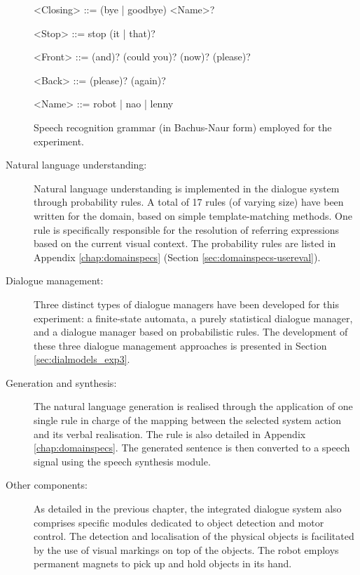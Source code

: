 \begin{description}
\begin{table}[p!]
\begin{grammar}
<Closing> ::= (bye | goodbye) <Name>?

<Stop> ::= stop (it | that)?
 
<Front> ::= (and)? (could you)? (now)? (please)?

<Back> ::= (please)? (again)?

<Name> ::= robot | nao | lenny

\end{grammar}
\caption{Speech recognition grammar (in Bachus-Naur form) employed for the experiment.}
\label{table:asr}
\end{table}

\item[Natural language understanding: ] Natural language understanding is implemented in the dialogue system through probability rules.  A total of 17 rules (of varying size) have been written for the domain, based on simple template-matching methods. One rule is specifically responsible for the resolution of referring expressions based on the current visual context. The probability rules are listed in Appendix \ref{chap:domainspecs} (Section \ref{sec:domainspecs-usereval}). 

\item[Dialogue management: ] Three distinct types of dialogue managers have been developed for this experiment: a finite-state automata, a purely statistical dialogue manager, and a dialogue manager based on probabilistic rules.  The development of these three dialogue management approaches is presented in Section \ref{sec:dialmodels_exp3}. 

\item[Generation and synthesis: ] The natural language generation is realised through the application of one single rule in charge of the mapping between the selected system action and its verbal realisation. The rule is also detailed in Appendix \ref{chap:domainspecs}.  The generated sentence is then converted to a speech signal using the speech synthesis module.

\item [Other components: ] As detailed in the previous chapter, the integrated dialogue system also comprises specific modules dedicated to object detection and motor control.  The detection and localisation of the physical objects is facilitated by the use of visual markings on top of the objects.  The robot employs permanent magnets to pick up and hold objects in its hand. 

\end{description}

